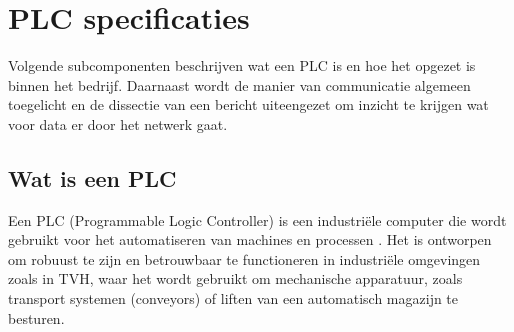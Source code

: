 



 
\section{PLC specificaties}
Volgende subcomponenten beschrijven wat een PLC is en hoe het opgezet is binnen het bedrijf.
Daarnaast wordt de manier van communicatie algemeen toegelicht en de dissectie van een bericht uiteengezet 
om inzicht te krijgen wat voor data er door het netwerk gaat.

\subsection{Wat is een PLC}
Een PLC (Programmable Logic Controller) is een industriële computer die wordt gebruikt voor het automatiseren van machines en processen \autocite{Bolton2015}. 
Het is ontworpen om robuust te zijn en betrouwbaar te functioneren in industriële omgevingen zoals in TVH, 
waar het wordt gebruikt om mechanische apparatuur, zoals transport systemen (conveyors) of liften van een automatisch magazijn te besturen.

